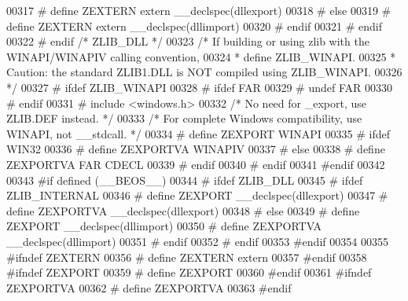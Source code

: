 \begin{DoxyCode}
00317 \textcolor{preprocessor}{#        define ZEXTERN extern \_\_declspec(dllexport)}
00318 \textcolor{preprocessor}{#      else}
00319 \textcolor{preprocessor}{#        define ZEXTERN extern \_\_declspec(dllimport)}
00320 \textcolor{preprocessor}{#      endif}
00321 \textcolor{preprocessor}{#    endif}
00322 \textcolor{preprocessor}{#  endif  }\textcolor{comment}{/* ZLIB\_DLL */}\textcolor{preprocessor}{}
00323    \textcolor{comment}{/* If building or using zlib with the WINAPI/WINAPIV calling convention,}
00324 \textcolor{comment}{    * define ZLIB\_WINAPI.}
00325 \textcolor{comment}{    * Caution: the standard ZLIB1.DLL is NOT compiled using ZLIB\_WINAPI.}
00326 \textcolor{comment}{    */}
00327 \textcolor{preprocessor}{#  ifdef ZLIB\_WINAPI}
00328 \textcolor{preprocessor}{#    ifdef FAR}
00329 \textcolor{preprocessor}{#      undef FAR}
00330 \textcolor{preprocessor}{#    endif}
00331 \textcolor{preprocessor}{#    include <windows.h>}
00332      \textcolor{comment}{/* No need for \_export, use ZLIB.DEF instead. */}
00333      \textcolor{comment}{/* For complete Windows compatibility, use WINAPI, not \_\_stdcall. */}
00334 \textcolor{preprocessor}{#    define ZEXPORT WINAPI}
00335 \textcolor{preprocessor}{#    ifdef WIN32}
00336 \textcolor{preprocessor}{#      define ZEXPORTVA WINAPIV}
00337 \textcolor{preprocessor}{#    else}
00338 \textcolor{preprocessor}{#      define ZEXPORTVA FAR CDECL}
00339 \textcolor{preprocessor}{#    endif}
00340 \textcolor{preprocessor}{#  endif}
00341 \textcolor{preprocessor}{#endif}
00342 
00343 \textcolor{preprocessor}{#if defined (\_\_BEOS\_\_)}
00344 \textcolor{preprocessor}{#  ifdef ZLIB\_DLL}
00345 \textcolor{preprocessor}{#    ifdef ZLIB\_INTERNAL}
00346 \textcolor{preprocessor}{#      define ZEXPORT   \_\_declspec(dllexport)}
00347 \textcolor{preprocessor}{#      define ZEXPORTVA \_\_declspec(dllexport)}
00348 \textcolor{preprocessor}{#    else}
00349 \textcolor{preprocessor}{#      define ZEXPORT   \_\_declspec(dllimport)}
00350 \textcolor{preprocessor}{#      define ZEXPORTVA \_\_declspec(dllimport)}
00351 \textcolor{preprocessor}{#    endif}
00352 \textcolor{preprocessor}{#  endif}
00353 \textcolor{preprocessor}{#endif}
00354 
00355 \textcolor{preprocessor}{#ifndef ZEXTERN}
00356 \textcolor{preprocessor}{#  define ZEXTERN extern}
00357 \textcolor{preprocessor}{#endif}
00358 \textcolor{preprocessor}{#ifndef ZEXPORT}
00359 \textcolor{preprocessor}{#  define ZEXPORT}
00360 \textcolor{preprocessor}{#endif}
00361 \textcolor{preprocessor}{#ifndef ZEXPORTVA}
00362 \textcolor{preprocessor}{#  define ZEXPORTVA}
00363 \textcolor{preprocessor}{#endif}

\end{DoxyCode}
